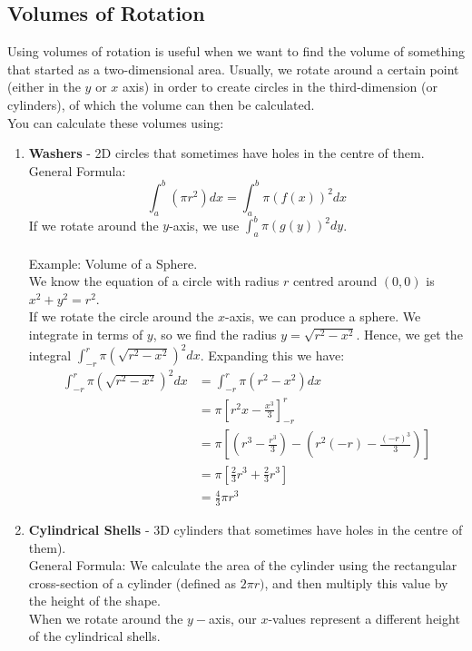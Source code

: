 \documentclass{article}
\begin{document}
\subsection{Volumes of Rotation}
Using volumes of rotation is useful when we want to find the volume of something that started as a two-dimensional area. Usually, we rotate around a certain point (either in the $y$ or $x$ axis) in order to create circles in the third-dimension (or cylinders), of which the volume can then be calculated.\\
You can calculate these volumes using:
\begin{enumerate}
    \item \textbf{Washers} - 2D circles that sometimes have holes in the centre of them.\\
    General Formula: $$\int_a^b (\pi r^2) dx = \int_a^b \pi (f(x))^2 dx$$
    If we rotate around the $y$-axis, we use $\int_a^b \pi (g(y))^2 dy$.\\
    \\
    Example: Volume of a Sphere.\\
    We know the equation of a circle with radius $r$ centred around $(0,0)$ is $x^2 + y^2 = r^2$.\\
    If we rotate the circle around the $x$-axis, we can produce a sphere. We integrate in terms of $y$, so we find the radius $y = \sqrt{r^2 - x^2}$. Hence, we get the integral $\int_{-r}^{r} \pi (\sqrt{r^2 - x^2})^2 dx$. Expanding this we have:
    \begin{align*}
        \int_{-r}^{r} \pi (\sqrt{r^2 - x^2})^2 dx & = \int_{-r}^{r} \pi (r^2 - x^2)dx\\
        & = \pi\left[ r^2x - \frac{x^3}{3}\right]_{-r}^r\\
        & = \pi\left[(r^3 - \frac{r^3}{3}) - (r^2(-r)  - \frac{(-r)^3}{3})\right]\\
        & = \pi\left[ \frac{2}{3}r^3 + \frac{2}{3}r^3\right]\\
        & = \frac{4}{3}\pi r^3
    \end{align*}
    \item \textbf{Cylindrical Shells} - 3D cylinders that sometimes have holes in the centre of them).\\
    General Formula: We calculate the area of the cylinder using the rectangular cross-section of a cylinder (defined as $2\pi r)$, and then multiply this value by the height of the shape.\\
    When we rotate around the $y-$axis, our $x$-values represent a different height of the cylindrical shells. \\

\end{enumerate}
\end{document}
